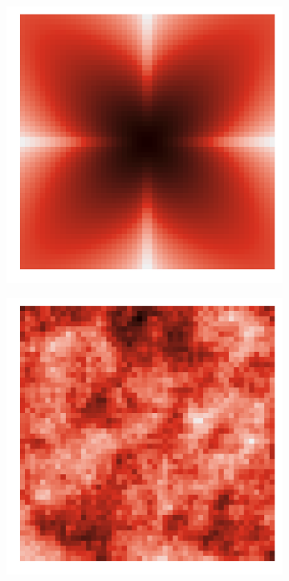 \documentclass{article}
\begin{document}
\begin{figure}
\begin{subfigure}{0.3\textwidth}
 		\includegraphics[width=\linewidth]{figures/p_smooth5}\\
 	\end{subfigure}
 	\begin{subfigure}{0.3\textwidth}
 		\includegraphics[width=\linewidth]{figures/p_realistic1}\\

\end{subfigure}
\end{figure}
\end{document}
